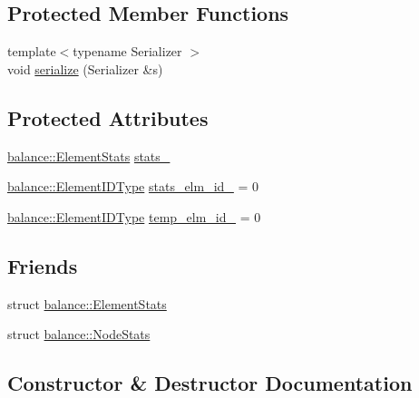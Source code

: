 \subsection*{Protected Member Functions}
\begin{DoxyCompactItemize}
\item 
{\footnotesize template$<$typename Serializer $>$ }\\void \hyperlink{structvt_1_1vrt_1_1collection_1_1_migratable_a2ff02da700394ecd37f3fbb6f0724a3e}{serialize} (Serializer \&s)
\end{DoxyCompactItemize}
\subsection*{Protected Attributes}
\begin{DoxyCompactItemize}
\item 
\hyperlink{structvt_1_1vrt_1_1collection_1_1balance_1_1_element_stats}{balance\+::\+Element\+Stats} \hyperlink{structvt_1_1vrt_1_1collection_1_1_migratable_a3572db662dd07c4f00b32e6198ef8da9}{stats\+\_\+}
\item 
\hyperlink{namespacevt_1_1vrt_1_1collection_1_1balance_a14c8d2c972f2913aa3f1636e5be0a120}{balance\+::\+Element\+I\+D\+Type} \hyperlink{structvt_1_1vrt_1_1collection_1_1_migratable_a5189d4eff453932c6f30f6e870414c1d}{stats\+\_\+elm\+\_\+id\+\_\+} = 0
\item 
\hyperlink{namespacevt_1_1vrt_1_1collection_1_1balance_a14c8d2c972f2913aa3f1636e5be0a120}{balance\+::\+Element\+I\+D\+Type} \hyperlink{structvt_1_1vrt_1_1collection_1_1_migratable_a3c8507a7d474295ac3d5b84e59e0bd1a}{temp\+\_\+elm\+\_\+id\+\_\+} = 0
\end{DoxyCompactItemize}
\subsection*{Friends}
\begin{DoxyCompactItemize}
\item 
struct \hyperlink{structvt_1_1vrt_1_1collection_1_1_migratable_abdce9596911e092af07635bdcc13acd1}{balance\+::\+Element\+Stats}
\item 
struct \hyperlink{structvt_1_1vrt_1_1collection_1_1_migratable_aeb7bfed9b6cf9f03ff3a2d6798de8dd0}{balance\+::\+Node\+Stats}
\end{DoxyCompactItemize}


\subsection{Constructor \& Destructor Documentation}
\mbox{\label{structvt_1_1vrt_1_1collection_1_1_migratable_a598f0bb3acfb602d437eab3625b105c5}} 
